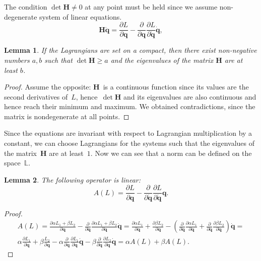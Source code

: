 \documentclass[sn-mathphys-num]{sn-jnl}
\theoremstyle{thmstylethree}
\theoremstyle{thmstyletwo}
\theoremstyle{thmstyleone}
\newtheorem{lemma}{Lemma}
\begin{document}
The condition $\det \mathbf{H} \neq 0$ at any point  must be held since we assume non-degenerate system of linear equations.
\begin{equation}
\label{eq:linear_equation_acc}
\mathbf{H}\ddot{\mathbf{q}} 
= \frac{\partial L}{\partial \mathbf{q}}-\frac{\partial}{\partial \mathbf{q}} \frac{\partial L}{\partial \dot{\mathbf{q}}} \dot{\mathbf{q}},
\end{equation}

\begin{lemma} \label{lemma1}
If the Lagrangians are set on a compact, then there exist non-negative numbers $a, b$ such that $\det \mathbf{H} \ge a$ and the eigenvalues of the matrix $\mathbf{H}$ are at least $b$.
\end{lemma}
\begin{proof}
Assume the opposite: $\mathbf{H}$~is a continuous function since its values are the second derivatives of~$L$, hence~$\det \mathbf{H}$ and its eigenvalues are also continuous and hence reach their minimum and maximum. We obtained contradictions, since the matrix is nondegenerate at all points.
\end{proof}


Since the equations are invariant with respect to Lagrangian multiplication by a constant,
we can choose Lagrangians for the systems such that the eigenvalues of the matrix~$\mathbf{H}$ are at
least~$1$. Now we can see that a norm can be defined on the space~$\mathbb{L}$. 

\begin{lemma} \label{lemma2}
The following operator is linear:
\[A (L) = \frac{\partial L}{\partial \mathbf{q}}-\frac{\partial}{\partial \dot{\mathbf{q}}} \frac{\partial L}{\partial \dot{\mathbf{q}}} \mathbf{q}.
\]
\end{lemma}
\begin{proof}
\[
\begin{split}
A (L) = 
\frac{\partial \alpha L_1 + \beta L_2}{\partial \mathbf{q}}-\frac{\partial}{\partial \dot{\mathbf{q}}} \frac{\partial \alpha L_1 + \beta L_2}{\partial \dot{\mathbf{q}}} \dot{\mathbf{q}} = 
\frac{\partial \alpha L_1}{\partial \mathbf{q}} + \frac{\partial\beta L_2}{\partial \mathbf{q}} - \left(\frac{\partial}{\partial \dot{\mathbf{q}}} \frac{\partial \alpha L_1}{\partial \dot{\mathbf{q}}} + \frac{\partial}{\partial \dot{\mathbf{q}}} \frac{\partial \beta L_2}{\partial \dot{\mathbf{q}}}\right) \dot{\mathbf{q}} = 
\\
\alpha\frac{\partial  L_1 }{\partial \mathbf{q}} + \beta\frac{L_2}{\partial \mathbf{q}} -  \alpha\frac{\partial}{\partial \dot{\mathbf{q}}} \frac{\partial L_1}{\partial \dot{\mathbf{q}}}\dot{\mathbf{q}} -  \beta\frac{\partial}{\partial \dot{\mathbf{q}}} \frac{\partial L_2}{\partial \dot{\mathbf{q}}} \dot{\mathbf{q}} = 
\alpha A(L) + \beta A(L).
\end{split}
\]
\end{proof}
\end{document}
